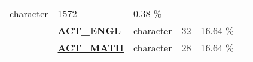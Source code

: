 \documentclass[]{article}
\begin{document}
\begin{longtable}[]{@{}lllrcl@{}}
\begin{minipage}[t]{0.12\columnwidth}
character\strut
\end{minipage} & \begin{minipage}[t]{0.11\columnwidth}\raggedleft\strut
1572\strut
\end{minipage} & \begin{minipage}[t]{0.10\columnwidth}\centering\strut
0.38 \%\strut
\end{minipage} & \begin{minipage}[t]{0.13\columnwidth}\raggedright\strut
\strut
\end{minipage}\tabularnewline
\begin{minipage}[t]{0.08\columnwidth}\raggedright\strut
\strut
\end{minipage} & \begin{minipage}[t]{0.28\columnwidth}\raggedright\strut
\textbf{\protect\hyperlink{act_engl}{ACT\_ENGL}}\strut
\end{minipage} & \begin{minipage}[t]{0.12\columnwidth}\raggedright\strut
character\strut
\end{minipage} & \begin{minipage}[t]{0.11\columnwidth}\raggedleft\strut
32\strut
\end{minipage} & \begin{minipage}[t]{0.10\columnwidth}\centering\strut
16.64 \%\strut
\end{minipage} & \begin{minipage}[t]{0.13\columnwidth}\raggedright\strut
\strut
\end{minipage}\tabularnewline
\begin{minipage}[t]{0.08\columnwidth}\raggedright\strut
\strut
\end{minipage} & \begin{minipage}[t]{0.28\columnwidth}\raggedright\strut
\textbf{\protect\hyperlink{act_math}{ACT\_MATH}}\strut
\end{minipage} & \begin{minipage}[t]{0.12\columnwidth}\raggedright\strut
character\strut
\end{minipage} & \begin{minipage}[t]{0.11\columnwidth}\raggedleft\strut
28\strut
\end{minipage} & \begin{minipage}[t]{0.10\columnwidth}\centering\strut
16.64 \%\strut
\end{minipage} & \begin{minipage}[t]{0.13\columnwidth}\raggedright\strut
\strut
\end{minipage}\tabularnewline

\end{longtable}
\end{document}
